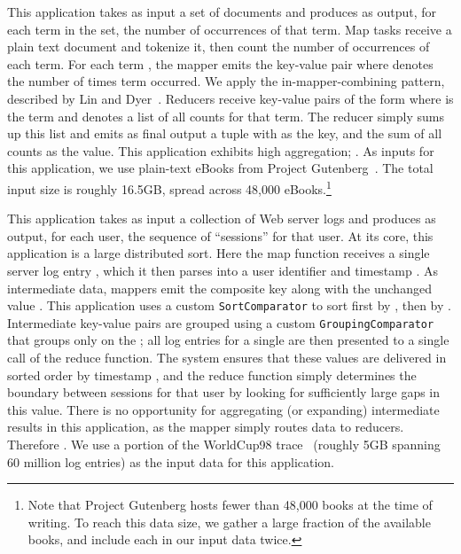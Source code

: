  This application takes as input a set of
documents and produces as output, for each term in the set, the number of
occurrences of that term.
Map tasks receive a plain text document and tokenize it, then count the number
of occurrences of each term.
For each term , the mapper emits the key-value pair  where 
denotes the number of times term  occurred.
We apply the in-mapper-combining pattern, described by Lin and
Dyer~\cite{lin2010ditp}.
Reducers receive key-value pairs of the form  where  is the
term and  denotes a list of all counts for that term.
The reducer simply sums up this list and emits as final output a tuple with 
as the key, and the sum of all counts as the value.
This application exhibits high aggregation; .
As inputs for this application, we use plain-text eBooks from Project
Gutenberg~\cite{gutenberg}.
The total input size is roughly 16.5\unit{GB}, spread across 48,000
eBooks.\footnote{Note that Project Gutenberg hosts fewer than 48,000 books at
the time of writing.  To reach this data size, we gather a large fraction of
the available books, and include each in our input data twice.}

 This application takes as input a collection
of Web server logs and produces as output, for each user, the sequence of
``sessions'' for that user.
At its core, this application is a large distributed sort.
Here the map function receives a single server log entry , which it then
parses into a user identifier  and timestamp .
As intermediate data, mappers emit the composite key  along with the
unchanged value .
This application uses a custom \verb=SortComparator= to sort first by ,
then by .
Intermediate key-value pairs are grouped using a custom
\verb=GroupingComparator= that groups only on the ; all log entries for a
single  are then presented to a single call of the reduce function.
The system ensures that these values are delivered in sorted order by timestamp
, and the reduce function simply determines the boundary between sessions
for that user by looking for sufficiently large gaps in this value.
There is no opportunity for aggregating (or expanding) intermediate results in
this application, as the mapper simply routes data to reducers.
Therefore .
We use a portion of the WorldCup98 trace~\cite{wc98} (roughly 5\unit{GB}
spanning 60 million log entries) as the input data for this application.

